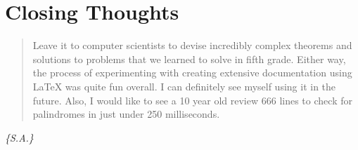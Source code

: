 \documentclass[letterpaper, 10pt]{article}
\begin{document}
\section{Closing Thoughts}
\begin{quote}
    Leave it to computer scientists to devise incredibly complex theorems and solutions to problems that we learned to solve in fifth grade. Either way, the process of experimenting with creating extensive documentation using \LaTeX \hspace{.025em} was quite fun overall. I can definitely see myself using it in the future. Also, I would like to see a 10 year old review 666 lines to check for palindromes in just under 250 milliseconds.
\end{quote}
{\textit{\color{red}\huge{\{S.A.\}}}}

\vspace{1.5em}
\begin{center}
    
\end{center}
\end{document}
